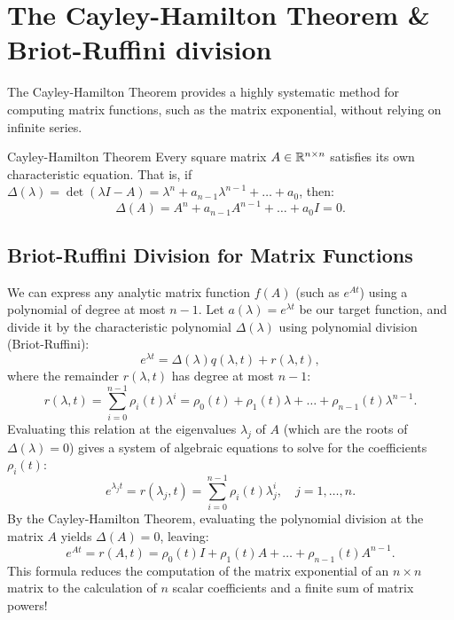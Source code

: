 \section{The Cayley-Hamilton Theorem \& Briot-Ruffini division}
The Cayley-Hamilton Theorem provides a highly systematic method for computing matrix functions, such as the matrix exponential, without relying on infinite series.

\begin{mytheorem}{Cayley-Hamilton Theorem}
Every square matrix $A \in \mathbb{R}^{n \times n}$ satisfies its own characteristic equation. That is, if $\Delta(\lambda) = \det(\lambda I - A) = \lambda^n + a_{n-1} \lambda^{n-1} + \dots + a_0$, then:
\begin{equation}
\Delta(A) = A^n + a_{n-1} A^{n-1} + \dots + a_0 I = 0 .
\end{equation}
\end{mytheorem}

\subsection{Briot-Ruffini Division for Matrix Functions}
We can express any analytic matrix function $f(A)$ (such as $e^{At}$) using a polynomial of degree at most $n-1$. Let $a(\lambda) = e^{\lambda t}$ be our target function, and divide it by the characteristic polynomial $\Delta(\lambda)$ using polynomial division (Briot-Ruffini):
\begin{equation}
e^{\lambda t} = \Delta(\lambda) q(\lambda, t) + r(\lambda, t) ,
\end{equation}
where the remainder $r(\lambda, t)$ has degree at most $n-1$:
\begin{equation}
r(\lambda, t) = \sum_{i=0}^{n-1} \rho_i(t) \lambda^i = \rho_0(t) + \rho_1(t) \lambda + \dots + \rho_{n-1}(t) \lambda^{n-1} .
\end{equation}
Evaluating this relation at the eigenvalues $\lambda_j$ of $A$ (which are the roots of $\Delta(\lambda) = 0$) gives a system of algebraic equations to solve for the coefficients $\rho_i(t)$:
\begin{equation}
e^{\lambda_j t} = r(\lambda_j, t) = \sum_{i=0}^{n-1} \rho_i(t) \lambda_j^i, \quad j=1,\dots,n .
\end{equation}
By the Cayley-Hamilton Theorem, evaluating the polynomial division at the matrix $A$ yields $\Delta(A) = 0$, leaving:
\begin{equation}
e^{At} = r(A, t) = \rho_0(t) I + \rho_1(t) A + \dots + \rho_{n-1}(t) A^{n-1} .
\end{equation}
This formula reduces the computation of the matrix exponential of an $n \times n$ matrix to the calculation of $n$ scalar coefficients and a finite sum of matrix powers!

